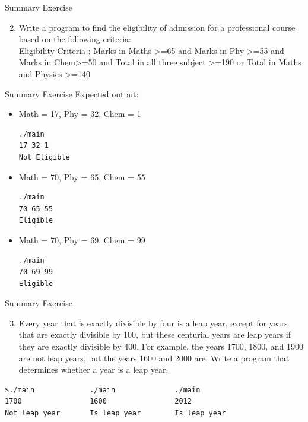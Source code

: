 \documentclass[10pt,xcolor={table,dvipsnames},t]{beamer}
\begin{document}
\begin{frame}{Summary Exercise}

\begin{enumerate}
  \setcounter{enumi}{1}
  \item Write a program to find the eligibility of admission for a professional course based on the following criteria:\\
  \vspace{1mm}
  Eligibility Criteria : Marks in Maths >=65 and Marks in Phy >=55 and Marks in Chem>=50 and Total in all three subject >=190 or Total in Maths and Physics >=140 
\end{enumerate}
\end{frame}

\begin{frame}[fragile]{Summary Exercise}
Expected output:
\begin{itemize}
  \item Math = 17, Phy = 32, Chem = 1
\begin{lstlisting}[language=bash]
./main
17 32 1
Not Eligible
\end{lstlisting}
  \item Math = 70, Phy = 65, Chem = 55
\begin{lstlisting}[language=bash]
./main
70 65 55
Eligible
\end{lstlisting}
  \item Math = 70, Phy = 69, Chem = 99
\begin{lstlisting}[language=bash]
./main
70 69 99
Eligible
\end{lstlisting}
\end{itemize}
\end{frame}

\begin{frame}[fragile]{Summary Exercise}
\begin{enumerate}
  \setcounter{enumi}{2}
  \item Every year that is exactly divisible by four is a leap year, except for years that are exactly divisible by 100, but these centurial years are leap years if they are exactly divisible by 400. For example, the years 1700, 1800, and 1900 are not leap years, but the years 1600 and 2000 are. Write a program that determines whether a year is a leap year.
\end{enumerate}
\begin{lstlisting}
$./main             ./main              ./main
1700                1600                2012
Not leap year       Is leap year        Is leap year
\end{lstlisting}
\end{frame}
\end{document}
